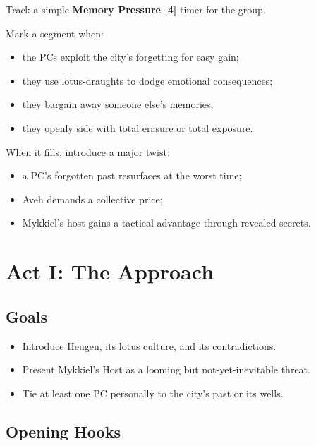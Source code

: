 \documentclass[11pt]{article}
\begin{document}
\begin{tcolorbox}[title=\textbf{Light Mechanic: Memory Pressure},colback=purple!5!white,colframe=purple!60!black,breakable]
Track a simple \textbf{Memory Pressure [4]} timer for the group.

Mark a segment when:
\begin{itemize}
  \item the PCs exploit the city's forgetting for easy gain;
  \item they use lotus-draughts to dodge emotional consequences;
  \item they bargain away someone else's memories;
  \item they openly side with total erasure or total exposure.
\end{itemize}

When it fills, introduce a major twist:
\begin{itemize}
  \item a PC's forgotten past resurfaces at the worst time;
  \item Aveh demands a collective price;
  \item Mykkiel's host gains a tactical advantage through revealed secrets.
\end{itemize}
\end{tcolorbox}

\section{Act I: The Approach}
\label{sec:act1}

\subsection*{Goals}

\begin{itemize}[leftmargin=*]
  \item Introduce Heugen, its lotus culture, and its contradictions.
  \item Present Mykkiel's Host as a looming but not-yet-inevitable threat.
  \item Tie at least one PC personally to the city's past or its wells.
\end{itemize}

\subsection*{Opening Hooks}
\end{document}
